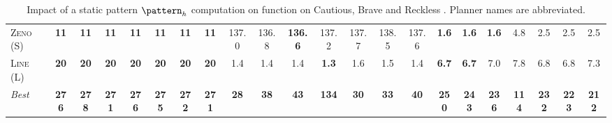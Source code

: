 \documentclass[11pt,landscape]{article}
\begin{document}
\begin{table}[tb]
{\begin{tabular}{|l||ccccccc||ccccccc||ccccccc||}
\textsc{Zeno} (S)&\textbf{11}&\textbf{11}&\textbf{11}&\textbf{11}&\textbf{11}&\textbf{11}&\textbf{11}&137.0&136.8&\textbf{136.6}&137.2&137.7&138.5&137.6&\textbf{1.6}&\textbf{1.6}&\textbf{1.6}&4.8&2.5&2.5&2.5\\
\textsc{Line} (L)&\textbf{20}&\textbf{20}&\textbf{20}&\textbf{20}&\textbf{20}&\textbf{20}&\textbf{20}&1.4&1.4&1.4&\textbf{1.3}&1.6&1.5&1.4&\textbf{6.7}&\textbf{6.7}&7.0&7.8&6.8&6.8&7.3
\\\hline
\textit{Best}&\textbf{276}&\textbf{278}&\textbf{271}&\textbf{276}&\textbf{275}&\textbf{272}&\textbf{271}&\textbf{28}&\textbf{38}&\textbf{43}&\textbf{134}&\textbf{30}&\textbf{33}&\textbf{40}&\textbf{250}&\textbf{243}&\textbf{236}&\textbf{114}&\textbf{232}&\textbf{223}&\textbf{212}\\\hline

        \end{tabular}}
        \caption{Impact of a static pattern $\pattern_h$ computation on function on Cautious, Brave and Reckless \pattyd. Planner names are abbreviated.}
        \label{tab:abl-patternh-static}
        \end{table}
        
\end{document}
